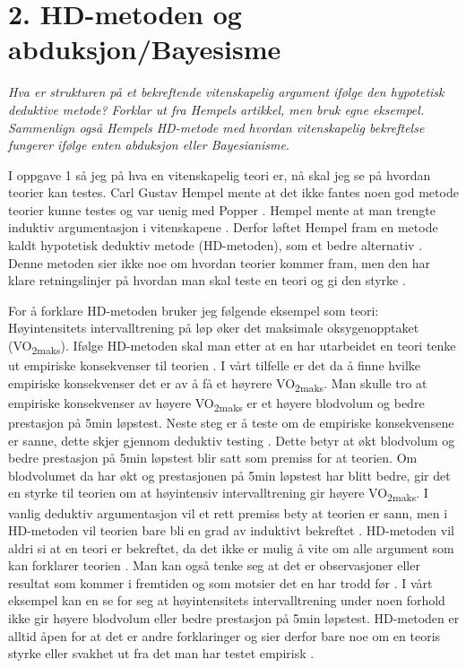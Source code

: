 \documentclass[
]{book}
\begin{document}
\hypertarget{hd-metoden-og-abduksjonbayesisme}{%
\section{2. HD-metoden og abduksjon/Bayesisme}\label{hd-metoden-og-abduksjonbayesisme}}

\emph{Hva er strukturen på et bekreftende vitenskapelig argument ifølge den
hypotetisk deduktive metode? Forklar ut fra Hempels artikkel, men bruk
egne eksempel. Sammenlign også Hempels HD-metode med hvordan
vitenskapelig bekreftelse fungerer ifølge enten abduksjon eller
Bayesianisme}.

I oppgave 1 så jeg på hva en vitenskapelig teori er, nå skal jeg se på
hvordan teorier kan testes. Carl Gustav Hempel mente at det ikke fantes
noen god metode teorier kunne testes og var uenig med Popper
\citep{hempel1966}. Hempel mente at man trengte induktiv argumentasjon i
vitenskapene \citep{hempel1966}. Derfor løftet Hempel fram en metode kaldt
hypotetisk deduktiv metode (HD-metoden), som et bedre alternativ
\citep{hempel1966}. Denne metoden sier ikke noe om hvordan teorier kommer
fram, men den har klare retningslinjer på hvordan man skal teste en
teori og gi den styrke \citep{hempel1966}.

For å forklare HD-metoden bruker jeg følgende eksempel som teori:
Høyintensitets intervalltrening på løp øker det maksimale
oksygenopptaket (VO\textsubscript{2maks}). Ifølge HD-metoden skal man etter at en har
utarbeidet en teori tenke ut empiriske konsekvenser til teorien
\citep{hempel1966}. I vårt tilfelle er det da å finne hvilke empiriske
konsekvenser det er av å få et høyrere VO\textsubscript{2maks}. Man skulle tro at
empiriske konsekvenser av høyere VO\textsubscript{2maks} er et høyere blodvolum og
bedre prestasjon på 5min løpstest. Neste steg er å teste om de empiriske
konsekvensene er sanne, dette skjer gjennom deduktiv testing
\citep{hempel1966}. Dette betyr at økt blodvolum og bedre prestasjon på 5min
løpstest blir satt som premiss for at teorien. Om blodvolumet da har økt
og prestasjonen på 5min løpstest har blitt bedre, gir det en styrke til
teorien om at høyintensiv intervalltrening gir høyere VO\textsubscript{2maks}. I
vanlig deduktiv argumentasjon vil et rett premiss bety at teorien er
sann, men i HD-metoden vil teorien bare bli en grad av induktivt
bekreftet \citep{hempel1966}. HD-metoden vil aldri si at en teori er
bekreftet, da det ikke er mulig å vite om alle argument som kan
forklarer teorien \citep{hempel1966}. Man kan også tenke seg at det er
observasjoner eller resultat som kommer i fremtiden og som motsier det
en har trodd før \citep{hempel1966}. I vårt eksempel kan en se for seg at
høyintensitets intervalltrening under noen forhold ikke gir høyere
blodvolum eller bedre prestasjon på 5min løpstest. HD-metoden er alltid
åpen for at det er andre forklaringer og sier derfor bare noe om en
teoris styrke eller svakhet ut fra det man har testet empirisk
\citep{hempel1966}.
\end{document}
